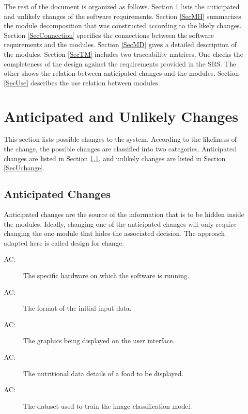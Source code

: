 \documentclass[12pt, titlepage]{article}
\newcounter{acnum}
\newcommand{\actheacnum}{AC\theacnum}
\begin{document}
The rest of the document is organized as follows. Section
\ref{SecChange} lists the anticipated and unlikely changes of the software
requirements. Section \ref{SecMH} summarizes the module decomposition that
was constructed according to the likely changes. Section \ref{SecConnection}
specifies the connections between the software requirements and the
modules. Section \ref{SecMD} gives a detailed description of the
modules. Section \ref{SecTM} includes two traceability matrices. One checks
the completeness of the design against the requirements provided in the SRS. The
other shows the relation between anticipated changes and the modules. Section
\ref{SecUse} describes the use relation between modules.

\section{Anticipated and Unlikely Changes} \label{SecChange}

This section lists possible changes to the system. According to the likeliness
of the change, the possible changes are classified into two
categories. Anticipated changes are listed in Section \ref{SecAchange}, and
unlikely changes are listed in Section \ref{SecUchange}.

\subsection{Anticipated Changes} \label{SecAchange}

Anticipated changes are the source of the information that is to be hidden
inside the modules. Ideally, changing one of the anticipated changes will only
require changing the one module that hides the associated decision. The approach
adapted here is called design for
change.

\begin{description}
\item[ \actheacnum \label{acHardware}:] The specific
  hardware on which the software is running.
\item[ \actheacnum \label{acInput}:] The format of the
  initial input data.
\item [ \actheacnum \label{acInput}:] The graphics being displayed on the user interface.
\item [ \actheacnum \label{acInput}:]  The nutritional data details of a food to be displayed. 
\item [ \actheacnum \label{acInput}:] The dataset used to train the image classification model.
\end{description}
\end{document}
